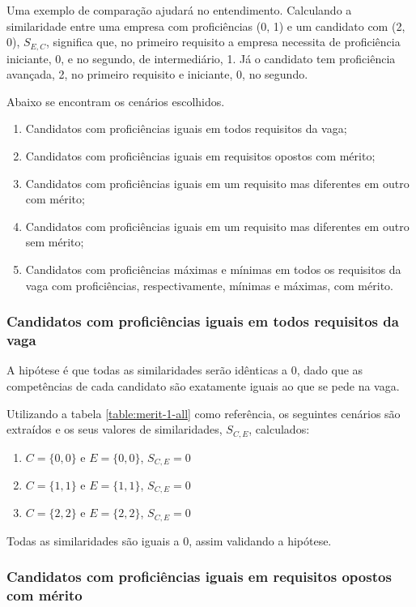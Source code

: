 \documentclass[preprint,12pt]{elsarticle}
\begin{document}
Uma exemplo de comparação ajudará no entendimento. Calculando a similaridade entre uma empresa com proficiências (0, 1) e um candidato com (2, 0), $S_{E,C}$, significa que, no primeiro requisito a empresa necessita de proficiência iniciante, 0, e no segundo, de intermediário, 1. Já o candidato tem proficiência avançada, 2, no primeiro requisito e iniciante, 0, no segundo. 

Abaixo se encontram os cenários escolhidos.

\begin{enumerate}
    \item Candidatos com proficiências iguais em todos requisitos da vaga;
    \item Candidatos com proficiências iguais em requisitos opostos com mérito;
    \item Candidatos com proficiências iguais em um requisito mas diferentes em outro com mérito;
    \item Candidatos com proficiências iguais em um requisito mas diferentes em outro sem mérito;
    \item Candidatos com proficiências máximas e mínimas em todos os requisitos da vaga com proficiências, respectivamente, mínimas e máximas, com mérito.
\end{enumerate}

\subsubsection{Candidatos com proficiências iguais em todos requisitos da vaga}

A hipótese é que todas as similaridades serão idênticas a 0, dado que as competências de cada candidato são exatamente iguais ao que se pede na vaga. 

Utilizando a tabela \ref{table:merit-1-all} como referência, os seguintes cenários são extraídos e os seus valores de similaridades, $S_{C, E}$, calculados:

\begin{enumerate}
    \item $C = \{0,0\}$ e $E = \{0,0\}$, $S_{C,E} = 0$
    \item $C = \{1,1\}$ e $E = \{1,1\}$, $S_{C,E} = 0$
    \item $C = \{2,2\}$ e $E = \{2,2\}$, $S_{C,E} = 0$
\end{enumerate}

Todas as similaridades são iguais a 0, assim validando a hipótese.

\subsubsection{Candidatos com proficiências iguais em requisitos opostos com mérito}
\end{document}
